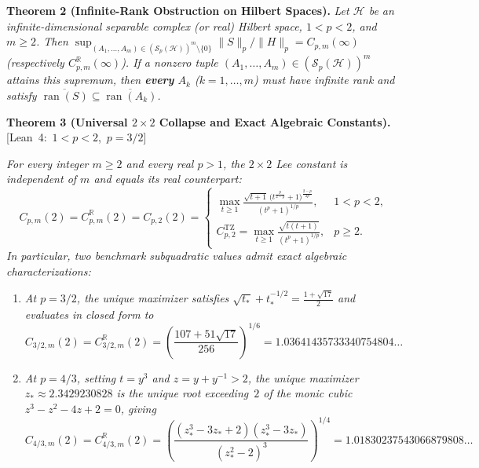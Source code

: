\documentclass[10pt,letterpaper]{article}
\newcommand{\leanbadge}[1]{\mbox{\sffamily\scriptsize\color{leanborder}[#1]}}
\newcommand{\R}{\mathbb{R}}
\newcommand{\Hilb}{\mathcal{H}}
\newcommand{\Sp}{\mathcal{S}_p}
\newcommand{\ran}{\operatorname{ran}}
\newcommand{\TZ}{\mathrm{TZ}}
\begin{document}
\begin{tcolorbox}[mathbox]
\textbf{Theorem 2 (Infinite-Rank Obstruction on Hilbert Spaces).}
\emph{Let $\Hilb$ be an infinite-dimensional separable complex (or real) Hilbert space, $1 < p < 2$, and $m \ge 2$. Then $\sup_{(A_1,\dots,A_m)\in(\Sp(\Hilb))^m\setminus\{0\}} \|S\|_p / \|H\|_p = C_{p,m}(\infty)$ (respectively $C_{p,m}^{\R}(\infty)$). If a nonzero tuple $(A_1,\dots,A_m) \in (\Sp(\Hilb))^m$ attains this supremum, then \textbf{every} $A_k$ ($k = 1,\dots,m$) must have infinite rank and satisfy $\overline{\ran(S)} \subseteq \overline{\ran(A_k)}$.}
\end{tcolorbox}

\begin{tcolorbox}[mathbox]
\textbf{Theorem 3 (Universal $2\times 2$ Collapse and Exact Algebraic Constants).}\hfill\leanbadge{Lean~4: $1<p<2$, $p=3/2$}\par\vspace{1.5pt}
\emph{For every integer $m \ge 2$ and every real $p > 1$, the $2\times 2$ Lee constant is independent of $m$ and equals its real counterpart:}
\[
  C_{p,m}(2) = C_{p,m}^{\R}(2) = C_{p,2}(2) =
  \begin{cases}
    \displaystyle \max_{t \ge 1}\frac{\sqrt{t+1}\,\bigl(t^{\frac{p}{2-p}} + 1\bigr)^{\frac{2-p}{2p}}}{(t^p + 1)^{1/p}}, & 1 < p < 2,\\[12pt]
    \displaystyle C_{p,2}^{\TZ} = \max_{t \ge 1}\frac{\sqrt{t(t+1)}}{(t^p + 1)^{1/p}}, & p \ge 2.
  \end{cases}
\]
\emph{In particular, two benchmark subquadratic values admit exact algebraic characterizations:}
\begin{enumerate}[leftmargin=1.6em,itemsep=2pt,topsep=3pt]
  \item \emph{At $p = 3/2$, the unique maximizer satisfies $\sqrt{t_*} + t_*^{-1/2} = \frac{1+\sqrt{17}}{2}$ and evaluates in closed form to}
  \[
    C_{3/2,m}(2) = C_{3/2,m}^{\R}(2) = \left(\frac{107 + 51\sqrt{17}}{256}\right)^{1/6} = 1.03641435733340754804\dots
  \]
  \item \emph{At $p = 4/3$, setting $t = y^3$ and $z = y + y^{-1} > 2$, the unique maximizer $z_* \approx 2.3429230828$ is the unique root exceeding~$2$ of the monic cubic $z^3 - z^2 - 4z + 2 = 0$, giving}
  \[
    C_{4/3,m}(2) = C_{4/3,m}^{\R}(2) = \left(\frac{(z_*^3 - 3z_* + 2)(z_*^3 - 3z_*)}{(z_*^2 - 2)^3}\right)^{1/4} = 1.01830237543066879808\dots
  \]
\end{enumerate}
\end{tcolorbox}
\end{document}
